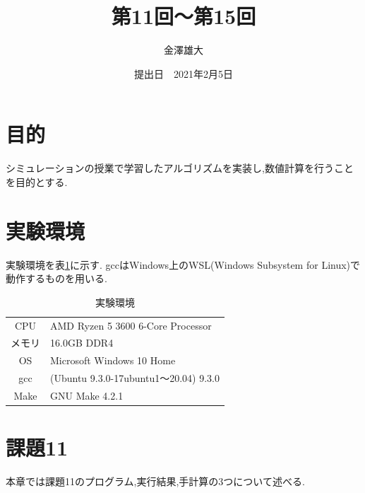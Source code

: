 \documentclass[a4j]{jarticle}
\title{第11回～第15回}
\date{提出日　2021年2月5日}
\author{金澤雄大}
\begin{document}
    \maketitle
    \thispagestyle{empty}
    \clearpage
    \addtocounter{page}{-1}
    \section{目的}
    シミュレーションの授業で学習したアルゴリズムを実装し,数値計算を行うことを目的とする.

    \section{実験環境}
      実験環境を表\ref{env}に示す. gccはWindows上のWSL(Windows Subsystem for Linux)で動作するものを用いる.
      \begin{table}[H]
        \caption{実験環境}
      \label{env}
      \begin{center}
          \begin{tabular}{c|l}\hline
            CPU & AMD Ryzen 5 3600 6-Core Processor \\ 
            メモリ & 16.0GB DDR4 \\
            OS & Microsoft Windows 10 Home \\
            gcc & (Ubuntu 9.3.0-17ubuntu1～20.04) 9.3.0 \\
            Make & GNU Make 4.2.1 \\ \hline
          \end{tabular}
      \end{center}
      \end{table}

      \section{課題11}
      本章では課題11のプログラム,実行結果,手計算の3つについて述べる.
\end{document}
